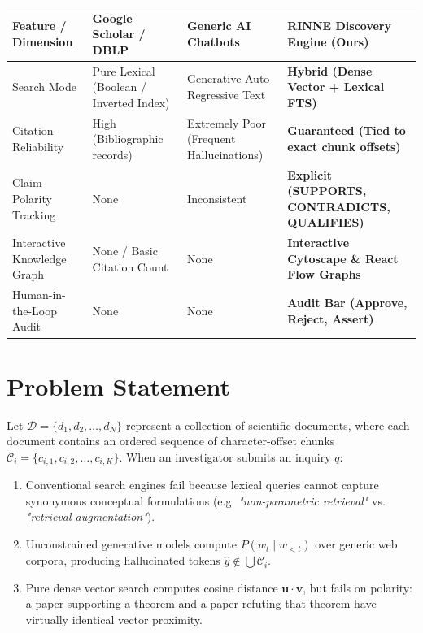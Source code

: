 \documentclass[11pt,a4paper,titlepage]{report}
\begin{document}
\begin{center}
\label{tab:existing_approaches}
\vspace{3pt}
\begin{tabularx}{\textwidth}{lXXX}
\toprule
\textbf{Feature / Dimension} & \textbf{Google Scholar / DBLP} & \textbf{Generic AI Chatbots} & \textbf{RINNE Discovery Engine (Ours)} \\
\midrule
Search Mode & Pure Lexical (Boolean / Inverted Index) & Generative Auto-Regressive Text & \textbf{Hybrid (Dense Vector + Lexical FTS)} \\
\addlinespace
Citation Reliability & High (Bibliographic records) & Extremely Poor (Frequent Hallucinations) & \textbf{Guaranteed (Tied to exact chunk offsets)} \\
\addlinespace
Claim Polarity Tracking & None & Inconsistent & \textbf{Explicit (SUPPORTS, CONTRADICTS, QUALIFIES)} \\
\addlinespace
Interactive Knowledge Graph & None / Basic Citation Count & None & \textbf{Interactive Cytoscape \& React Flow Graphs} \\
\addlinespace
Human-in-the-Loop Audit & None & None & \textbf{Audit Bar (Approve, Reject, Assert)} \\
\bottomrule
\end{tabularx}
\end{center}

\chapter{Problem Statement}

Let $\mathcal{D} = \{d_1, d_2, \dots, d_N\}$ represent a collection of scientific documents, where each document contains an ordered sequence of character-offset chunks $\mathcal{C}_i = \{c_{i,1}, c_{i,2}, \dots, c_{i,K}\}$. When an investigator submits an inquiry $q$:
\begin{enumerate}
    \item Conventional search engines fail because lexical queries cannot capture synonymous conceptual formulations (e.g. \textit{"non-parametric retrieval"} vs. \textit{"retrieval augmentation"}).
    \item Unconstrained generative models compute $P(w_t \mid w_{<t})$ over generic web corpora, producing hallucinated tokens $\hat{y} \notin \bigcup \mathcal{C}_i$.
    \item Pure dense vector search computes cosine distance $\mathbf{u} \cdot \mathbf{v}$, but fails on polarity: a paper supporting a theorem and a paper refuting that theorem have virtually identical vector proximity.
\end{enumerate}
\end{document}
